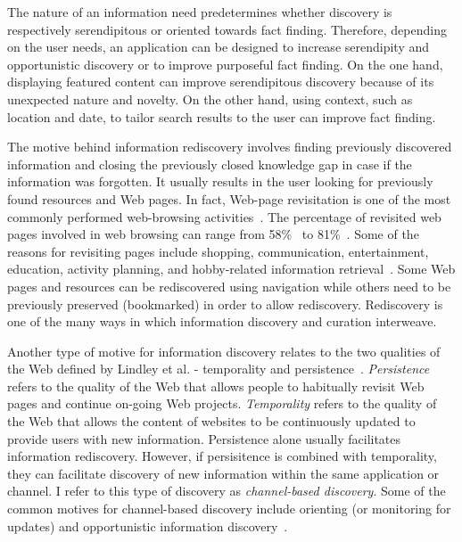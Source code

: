 {{The nature of an information need predetermines whether discovery is respectively serendipitous or oriented towards fact finding. Therefore, depending on the user needs, an application can be designed to increase serendipity and opportunistic discovery or to improve purposeful fact finding. On the one hand, displaying featured content can improve serendipitous discovery because of its unexpected nature and novelty. On the other hand, using context, such as location and date, to tailor search results to the user can improve fact finding. 

The motive behind information rediscovery involves finding previously discovered information and closing the previously closed knowledge gap in case if the information was forgotten. It usually results in the user looking for previously found resources and Web pages. In fact, Web-page revisitation is one of the most commonly performed web-browsing activities~\cite{adar2008large,cockburn2003improving}. The percentage of revisited web pages involved in web browsing can range from 58\%~\cite{tauscher1997people} to 81\%~\cite{cockburn2001web}. Some of the reasons for revisiting pages include shopping, communication, entertainment, education, activity planning, and hobby-related information retrieval~\cite{adar2008large}. Some Web pages and resources can be rediscovered using navigation while others need to be previously preserved (bookmarked) in order to allow rediscovery. Rediscovery is one of the many ways in which information discovery and curation interweave. 

Another type of motive for information discovery relates to the two qualities of the Web defined by Lindley et al. - temporality and persistence~\citep{lindley2012s}. \textit{Persistence} refers to the quality of the Web that allows people to habitually revisit Web pages and continue on-going Web projects. \textit{Temporality} refers to the quality of the Web that allows the content of websites to be continuously updated to provide users with new information. Persistence alone usually facilitates information rediscovery. However, if persisitence is combined with temporality, they can facilitate discovery of new information within the same application or channel. I refer to this type of discovery as \textit{channel-based discovery}. Some of the common motives for channel-based discovery include orienting (or monitoring for updates) and opportunistic information discovery~\citep{lindley2012s}.          
}

}

